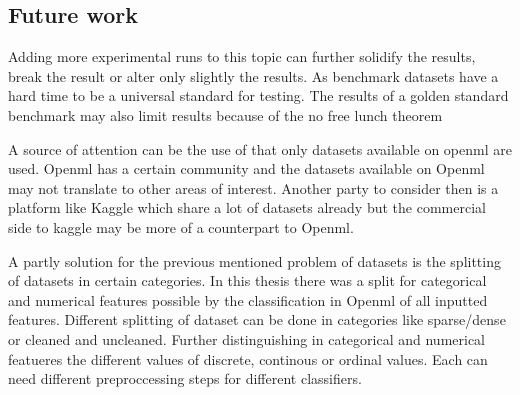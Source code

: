 \documentclass[a4paper,10pt]{article}
\begin{document}




\subsection{Future work}
Adding more experimental runs to this topic can further solidify the results, break the result or alter only slightly the results. As benchmark datasets have a hard time to be a universal standard for testing. The results of a golden standard benchmark may also limit results because of the no free lunch theorem

A source of attention can be the use of that only datasets available on openml are used. Openml has a certain community and the datasets available on Openml may not translate to other areas of interest. Another party to consider then is a platform like Kaggle which share a lot of datasets already but the commercial side to kaggle may be more of a counterpart to Openml. 

A partly solution for the previous mentioned problem of datasets is the splitting of datasets in certain categories. In this thesis there was a split for categorical and numerical features possible by the classification in Openml of all inputted features. Different splitting of dataset can be done in categories like sparse/dense or cleaned and uncleaned. Further distinguishing in categorical and numerical featueres the different values of discrete, continous or ordinal values. Each can need different preproccessing steps for different classifiers. 
\end{document}
